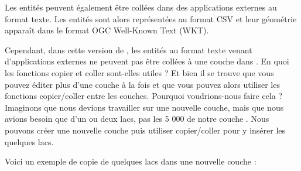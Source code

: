 Les entités peuvent également être collées dans des applications externes au 
format texte. Les entités sont alors représentées au format CSV et leur géométrie 
apparaît dans le format OGC Well-Known Text (WKT).

Cependant, dans cette version de \qg, les entités au format texte venant 
d'applications externes ne peuvent pas être collées à une couche dans \qg. En 
quoi les fonctions copier et coller sont-elles utiles ? Et bien il se trouve 
que vous pouvez éditer plus d'une couche à la fois et que vous pouvez alors 
utiliser les fonctions copier/coller entre les couches. Pourquoi voudrions-nous 
faire cela ? Imaginons que nous devions travailler sur une nouvelle couche, 
mais que nous avions besoin que d'un ou deux lacs, pas les 5 000 de notre 
couche . Nous pouvons créer une nouvelle couche puis 
utiliser copier/coller pour y insérer les quelques lacs.

Voici un exemple de copie de quelques lacs dans une nouvelle couche :


